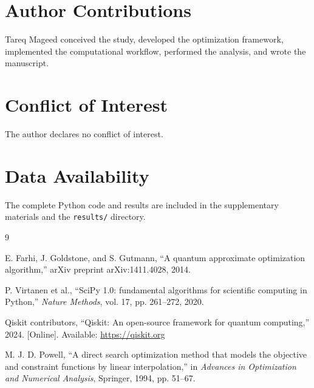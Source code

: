 \documentclass[12pt]{article}
\begin{document}
\section*{Author Contributions}
Tareq Mageed conceived the study, developed the optimization framework, implemented the computational workflow, performed the analysis, and wrote the manuscript.

\section*{Conflict of Interest}
The author declares no conflict of interest.

\section*{Data Availability}
The complete Python code and results are included in the supplementary materials and the \texttt{results/} directory.

\begin{thebibliography}{9}

E. Farhi, J. Goldstone, and S. Gutmann, ``A quantum approximate optimization algorithm,'' arXiv preprint arXiv:1411.4028, 2014.

P. Virtanen et al., ``SciPy 1.0: fundamental algorithms for scientific computing in Python,'' \textit{Nature Methods}, vol. 17, pp. 261--272, 2020.

Qiskit contributors, ``Qiskit: An open-source framework for quantum computing,'' 2024. [Online]. Available: \url{https://qiskit.org}

M. J. D. Powell, ``A direct search optimization method that models the objective and constraint functions by linear interpolation,'' in \textit{Advances in Optimization and Numerical Analysis}, Springer, 1994, pp. 51--67.

\end{thebibliography}
\end{document}
